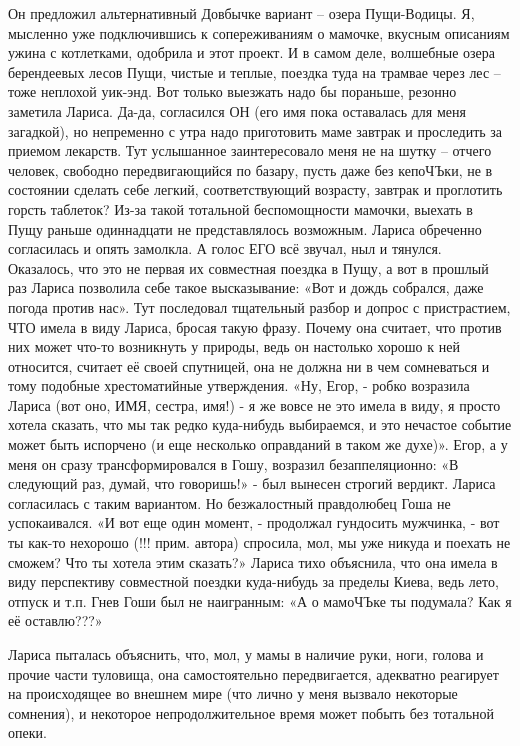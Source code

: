 Он предложил альтернативный Довбычке вариант – озера Пущи-Водицы. Я, мысленно
уже подключившись к сопереживаниям о мамочке, вкусным описаниям ужина с
котлетками, одобрила и этот проект. И в самом деле, волшебные озера берендеевых
лесов Пущи, чистые и теплые, поездка туда на трамвае через лес – тоже неплохой
уик-энд. Вот только выезжать надо бы пораньше, резонно заметила Лариса. Да-да,
согласился ОН (его имя пока оставалась для меня загадкой), но непременно с утра
надо приготовить маме завтрак и проследить за приемом лекарств. Тут услышанное
заинтересовало меня не на шутку – отчего человек, свободно передвигающийся по
базару, пусть даже без кепоЧЪки, не в состоянии сделать себе легкий,
соответствующий возрасту, завтрак и проглотить горсть таблеток? Из-за такой
тотальной беспомощности мамочки, выехать в Пущу раньше одиннадцати не
представлялось возможным. Лариса обреченно согласилась и опять замолкла. А
голос ЕГО всё звучал, ныл и тянулся. Оказалось, что это не первая их совместная
поездка в Пущу, а вот в прошлый раз Лариса позволила себе такое высказывание:
«Вот и дождь собрался, даже погода против нас». Тут последовал тщательный
разбор и допрос с пристрастием, ЧТО имела в виду Лариса, бросая такую фразу.
Почему она считает, что против них может что-то возникнуть у природы, ведь он
настолько хорошо к ней относится, считает её своей спутницей, она не должна ни
в чем сомневаться и тому подобные хрестоматийные утверждения. «Ну, Егор, -
робко возразила Лариса (вот оно, ИМЯ, сестра, имя!) - я же вовсе не это имела в
виду, я просто хотела сказать, что мы так редко куда-нибудь выбираемся, и это
нечастое событие может быть испорчено (и еще несколько оправданий в таком же
духе)». Егор, а у меня он сразу трансформировался в Гошу, возразил
безаппеляционно: «В следующий раз, думай, что говоришь!» - был вынесен строгий
вердикт. Лариса согласилась с таким вариантом. Но безжалостный правдолюбец Гоша
не успокаивался. «И вот еще один момент, - продолжал гундосить мужчинка, - вот
ты как-то нехорошо (!!! прим. автора) спросила, мол, мы уже никуда и поехать не
сможем? Что ты хотела этим сказать?» Лариса тихо объяснила, что она имела в
виду перспективу совместной поездки куда-нибудь за пределы Киева, ведь лето,
отпуск и т.п. Гнев Гоши был не наигранным: «А о мамоЧЪке ты подумала? Как я её
оставлю???»

Лариса пыталась объяснить, что, мол, у мамы в наличие руки, ноги, голова и
прочие части туловища, она самостоятельно передвигается, адекватно реагирует на
происходящее во внешнем мире (что лично у меня вызвало некоторые сомнения), и
некоторое непродолжительное время может побыть без тотальной опеки.

